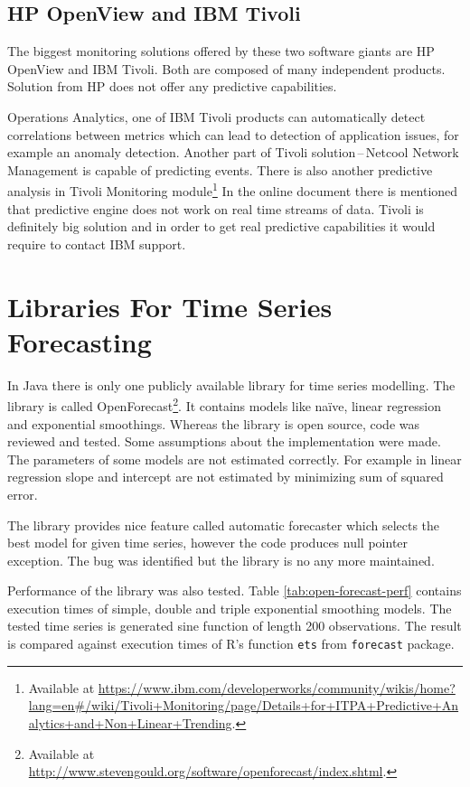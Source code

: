     \subsection{HP OpenView and IBM Tivoli}
    The biggest monitoring solutions offered by these two software giants are HP OpenView and IBM Tivoli. Both are
    composed of many independent products. Solution from HP does not offer any predictive capabilities.

    Operations Analytics, one of IBM Tivoli products can automatically detect correlations between
    metrics which can lead to detection of application issues, for example an anomaly detection. Another part of Tivoli
    solution\,--\,Netcool Network Management is capable of predicting events. There is also another predictive analysis
    in Tivoli Monitoring module\footnote{Available at
    \url{https://www.ibm.com/developerworks/community/wikis/home?lang=en\#/wiki/Tivoli+Monitoring/page/Details+for+ITPA+Predictive+Analytics+and+Non+Linear+Trending}.}
    In the online document there is mentioned that predictive engine does not work on real time streams of data. Tivoli
    is definitely big solution and in order to get real predictive capabilities it would require to contact IBM
    support.

    \section{Libraries For Time Series Forecasting} \label{libraries-for-ts}
    In Java there is only one publicly available library for time series modelling. The library is called
    OpenForecast\footnote{Available at \url{http://www.stevengould.org/software/openforecast/index.shtml}.}. It contains
    models like na\"{i}ve, linear regression and exponential smoothings. Whereas the library is open source, code
    was reviewed and tested. Some assumptions about the implementation were made. The parameters of some models are
    not estimated correctly. For example in linear regression slope and intercept are not estimated by minimizing
    sum of squared error.

    The library provides nice feature called automatic forecaster which selects the best model for given
    time series, however the code produces null pointer exception. The bug was identified but the library is no any more
    maintained.

    Performance of the library was also tested. Table \ref{tab:open-forecast-perf} contains execution times of
    simple, double and triple exponential smoothing models. The tested time series is generated sine function of
    length 200 observations. The result is compared against execution times of R's function \texttt{ets} from
    \texttt{forecast} package.


